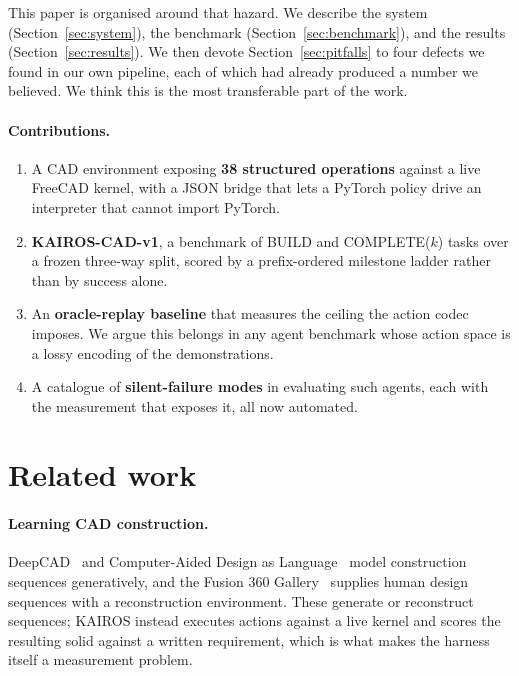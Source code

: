 \documentclass{article}
\begin{document}
This paper is organised around that hazard. We describe the system
(Section~\ref{sec:system}), the benchmark (Section~\ref{sec:benchmark}), and the
results (Section~\ref{sec:results}). We then devote Section~\ref{sec:pitfalls}
to four defects we found in our own pipeline, each of which had already produced
a number we believed. We think this is the most transferable part of the work.

\paragraph{Contributions.}
\begin{enumerate}\itemsep2pt
\item A CAD environment exposing \textbf{38 structured operations} against a
      live FreeCAD kernel, with a JSON bridge that lets a PyTorch policy drive
      an interpreter that cannot import PyTorch.
\item \textbf{KAIROS-CAD-v1}, a benchmark of BUILD and COMPLETE($k$) tasks over
      a frozen three-way split, scored by a prefix-ordered milestone ladder
      rather than by success alone.
\item An \textbf{oracle-replay baseline} that measures the ceiling the action
      codec imposes. We argue this belongs in any agent benchmark whose action
      space is a lossy encoding of the demonstrations.
\item A catalogue of \textbf{silent-failure modes} in evaluating such agents,
      each with the measurement that exposes it, all now automated.
\end{enumerate}

\section{Related work}\label{sec:related}

\paragraph{Learning CAD construction.} DeepCAD~\citep{wu2021deepcad} and
Computer-Aided Design as Language~\citep{ganin2021computer} model construction
sequences generatively, and the Fusion 360 Gallery~\citep{willis2021fusion}
supplies human design sequences with a reconstruction environment. These
generate or reconstruct sequences; KAIROS instead executes actions against a
live kernel and scores the resulting solid against a written requirement, which
is what makes the harness itself a measurement problem.
\end{document}
